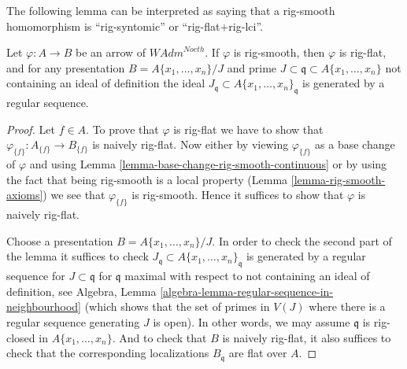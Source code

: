 \noindent
The following lemma can be interpreted as saying that a rig-smooth
homomorphism is ``rig-syntomic'' or ``rig-flat$+$rig-lci''.

\begin{lemma}
\label{lemma-rig-smooth-rig-flat}
Let $\varphi : A \to B$ be an arrow of $\textit{WAdm}^{Noeth}$.
If $\varphi$ is rig-smooth, then $\varphi$ is rig-flat, and
for any presentation $B = A\{x_1, \ldots, x_n\}/J$
and prime $J \subset \mathfrak q \subset A\{x_1, \ldots, x_n\}$
not containing an ideal of definition the ideal
$J_\mathfrak q \subset A\{x_1, \ldots, x_n\}_\mathfrak q$
is generated by a regular sequence.
\end{lemma}

\begin{proof}
Let $f \in A$. To prove that $\varphi$ is rig-flat we have to show
that $\varphi_{\{f\}} : A_{\{f\}} \to B_{\{f\}}$ is naively rig-flat.
Now either by viewing $\varphi_{\{f\}}$ as a base change of $\varphi$
and using Lemma \ref{lemma-base-change-rig-smooth-continuous}
or by using the fact that being rig-smooth
is a local property (Lemma \ref{lemma-rig-smooth-axioms}) we see that
$\varphi_{\{f\}}$ is rig-smooth. Hence it suffices to show
that $\varphi$ is naively rig-flat.

\medskip\noindent
Choose a presentation $B = A\{x_1, \ldots, x_n\}/J$.
In order to check the second part of the lemma it suffices
to check $J_\mathfrak q \subset A\{x_1, \ldots, x_n\}_\mathfrak q$
is generated by a regular sequence for $J \subset \mathfrak q$
for $\mathfrak q$ maximal with respect to not containing
an ideal of definition, see
Algebra, Lemma \ref{algebra-lemma-regular-sequence-in-neighbourhood}
(which shows that the set of primes in $V(J)$ where there is
a regular sequence generating $J$ is open).
In other words, we may assume $\mathfrak q$ is rig-closed
in $A\{x_1, \ldots, x_n\}$. And to check that
$B$ is naively rig-flat, it also suffices to
check that the corresponding localizations $B_\mathfrak q$
are flat over $A$.


\end{proof}
